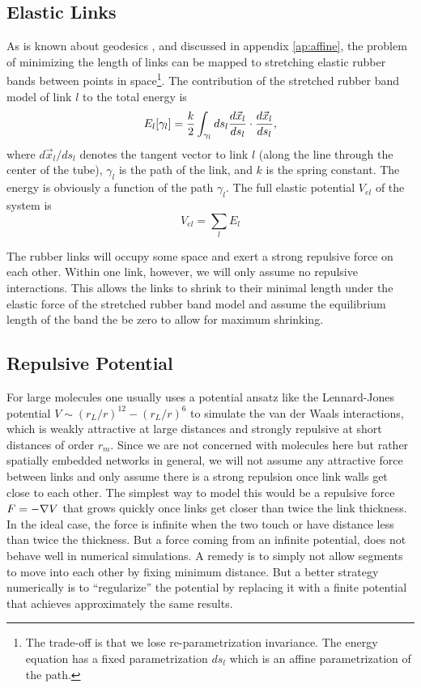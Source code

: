 \documentclass[linenumbers,endfloats,nofootinbib,preprint,floatfix,titlepage,superscriptaddress]{revtex4-1} %
\begin{document}
\subsection{Elastic Links}
As is known about geodesics \citep{novikov1984}, and discussed in appendix \ref{ap:affine}, the problem of minimizing the length of links can be mapped to stretching elastic rubber bands between points in space\footnote{The trade-off is that we lose re-parametrization invariance. The energy equation has a fixed parametrization $ds_l$ which is an affine parametrization of the path.}. The contribution of the stretched rubber band model of link $l$ to the total energy is
\begin{equation}
  E_l[\gamma_l] = {k\over 2}\int_{\gamma_l} ds_l {d\vec{x}_l\over ds_l} \cdot {d\vec{x}_l\over ds_l}, \label{eq:El}
\end{equation}
where $d\vec{x}_l/ds_l$ denotes the tangent vector to link $l$ (along the line through the center of the tube), $\gamma_l$ is the path of the link, and $k$ is the spring constant. 
The energy is obviously a function of the path $\gamma_l$. 
The full elastic potential $V_{el}$ of the system is
\begin{equation}
    V_{el} = \sum_l E_l
\end{equation}

The rubber links will occupy some space and exert a strong repulsive force on each other. Within one link, however, we will only assume no repulsive interactions. This allows the links to shrink to their minimal length under the elastic force of the stretched rubber band model and assume the equilibrium length of the band the be zero to allow for maximum shrinking. 

\subsection{Repulsive Potential\label{ap:repel}}

For large molecules one usually uses a potential ansatz like the Lennard-Jones potential $V \sim (r_L/r)^{12} - (r_L/r)^6 $ to simulate the van der Waals interactions, which is weakly attractive at large distances and strongly repulsive at short distances of order $r_m$. Since we are not concerned with molecules here but rather spatially embedded networks in general, we will not assume any attractive force between links and only assume there is a strong repulsion once link walls get close to each other. The simplest way to model this would be a repulsive force $F = -\nabla V$ that grows quickly once links get closer than twice the link thickness. In the ideal case, the force is infinite when the two touch or have distance less than twice the thickness. But a force coming from an infinite potential, does not behave well in numerical simulations. A remedy is to simply not allow segments to move into each other by fixing minimum distance. But a better strategy numerically is to ``regularize'' the potential by replacing it with a finite potential that achieves approximately the same results. 
\end{document}
